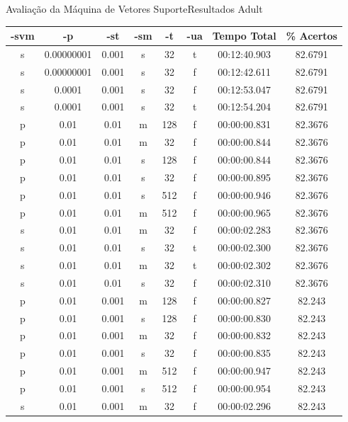 \documentclass{beamer}
\begin{document}
\begin{frame}{Avaliação da Máquina de Vetores Suporte}{Resultados Adult}
\begin{table}
    \footnotesize
    \centering
    \tabcolsep=0.11cm
    \begin{tabular}{|c|c|c|c|c|c|c|c|} \hline
		-svm & -p & -st & -sm & -t & -ua & Tempo Total & \% Acertos\\ \hline
		s & 0.00000001 & 0.001 & s & 32 & t & 00:12:40.903 & 82.6791\\ \hline
		s & 0.00000001 & 0.001 & s & 32 & f & 00:12:42.611 & 82.6791\\ \hline
		s & 0.0001 & 0.001 & s & 32 & f & 00:12:53.047 & 82.6791\\ \hline
		s & 0.0001 & 0.001 & s & 32 & t & 00:12:54.204 & 82.6791\\ \hline
		p & 0.01 & 0.01 & m & 128 & f & 00:00:00.831 & 82.3676\\ \hline
		p & 0.01 & 0.01 & m & 32 & f & 00:00:00.844 & 82.3676\\ \hline
		p & 0.01 & 0.01 & s & 128 & f & 00:00:00.844 & 82.3676\\ \hline
		p & 0.01 & 0.01 & s & 32 & f & 00:00:00.895 & 82.3676\\ \hline
		p & 0.01 & 0.01 & s & 512 & f & 00:00:00.946 & 82.3676\\ \hline
		p & 0.01 & 0.01 & m & 512 & f & 00:00:00.965 & 82.3676\\ \hline
		s & 0.01 & 0.01 & m & 32 & f & 00:00:02.283 & 82.3676\\ \hline
		s & 0.01 & 0.01 & s & 32 & t & 00:00:02.300 & 82.3676\\ \hline
		s & 0.01 & 0.01 & m & 32 & t & 00:00:02.302 & 82.3676\\ \hline
		s & 0.01 & 0.01 & s & 32 & f & 00:00:02.310 & 82.3676\\ \hline
		p & 0.01 & 0.001 & m & 128 & f & 00:00:00.827 & 82.243\\ \hline
		p & 0.01 & 0.001 & s & 128 & f & 00:00:00.830 & 82.243\\ \hline
		p & 0.01 & 0.001 & m & 32 & f & 00:00:00.832 & 82.243\\ \hline
		p & 0.01 & 0.001 & s & 32 & f & 00:00:00.835 & 82.243\\ \hline
		p & 0.01 & 0.001 & m & 512 & f & 00:00:00.947 & 82.243\\ \hline
		p & 0.01 & 0.001 & s & 512 & f & 00:00:00.954 & 82.243\\ \hline
		s & 0.01 & 0.001 & m & 32 & f & 00:00:02.296 & 82.243\\ \hline

\end{tabular}
\end{table}
\end{frame}
\end{document}
